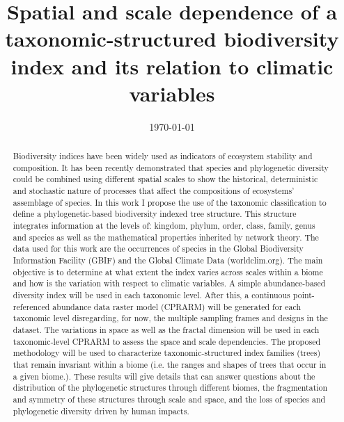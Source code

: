 \documentclass[twoside]{ecsthesis}      %
\begin{document}
\frontmatter
\title      {Spatial and scale dependence of a taxonomic-structured biodiversity index and its relation to climatic variables }
\addresses  {\groupname\\\deptname\\\univname}
\date       {\today}
\subject    {}
\maketitle
\begin{abstract}
Biodiversity indices have been widely used as indicators of ecosystem stability and composition. It has been recently demonstrated that species and phylogenetic diversity could be combined using different spatial scales to show the historical, deterministic and stochastic nature of processes that affect the compositions of ecosystems’ assemblage of species. In this work I propose the use of the taxonomic classification to define a phylogenetic-based biodiversity indexed tree structure.  This structure integrates information at the levels of: kingdom, phylum, order, class, family, genus and species as well as the mathematical properties inherited by network theory.  The data used for this work are the occurrences of species in the Global Biodiversity Information Facility (GBIF) and the Global Climate Data (worldclim.org).
The main objective is to determine at what extent the index varies across scales within a biome and how is the variation with respect to climatic variables. A simple abundance-based diversity index will be used in each taxonomic level. After this, a continuous point-referenced abundance data raster model (CPRARM) will be generated for each taxonomic level disregarding, for now, the multiple sampling frames and designs in the dataset.  The variations in space as well as the fractal dimension will be used in each taxonomic-level CPRARM to assess the space and scale dependencies. The proposed methodology will be used to characterize taxonomic-structured index families (trees) that remain invariant within a biome (i.e. the ranges and shapes of trees that occur in a given biome.). These results will give details that can answer questions about the distribution of the phylogenetic structures through different biomes, the fragmentation and symmetry of these structures through scale and space, and the loss of species and phylogenetic diversity driven by human impacts.

\end{abstract}
\tableofcontents
\listoffigures
\listoftables
\end{document}
